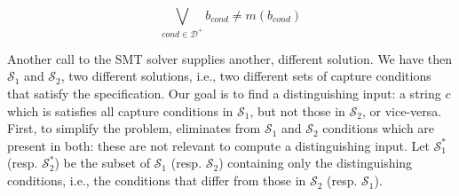 \begin{equation}\label{eq:cap_cond_soft}
\bigvee_{\textit{cond} \in \mathcal{D^+}} b_{\textit{cond}} \ne m(b_{\textit{cond}})
\end{equation}

Another call to the \ac{SMT} solver supplies another, different solution. We have then \(\mathcal{S}_1\) and \(\mathcal{S}_2\), two different solutions, i.e., two different sets of capture conditions that satisfy the specification. Our goal is to find a distinguishing input: a string \(c\) which is satisfies all capture conditions in \(\mathcal{S}_1\), but not those in \(\mathcal{S}_2\), or vice-versa. First, to simplify the problem, \Forest eliminates from \(\mathcal{S}_1\) and \(\mathcal{S}_2\) conditions which are present in both: these are not relevant to compute a distinguishing input. Let \(\mathcal{S}_1^*\) (resp. \(\mathcal{S}_2^*\)) be the subset of \(\mathcal{S}_1\) (resp. \(\mathcal{S}_2\)) containing only the distinguishing conditions, i.e., the conditions that differ from those in  \(\mathcal{S}_2\) (resp. \(\mathcal{S}_1\)).

